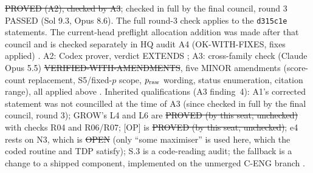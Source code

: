 \begin{statusbox}
\st{PROVED (A2), checked by A3}; checked in full by the final council, round 3 PASSED (Sol 9.3, Opus 8.6). The full round-3 check applies to the \texttt{d315c1e} statements. The current-head preflight allocation addition was made after that council and is checked separately in HQ audit A4 (OK-WITH-FIXES, fixes applied) . A2: Codex prover, verdict EXTENDS ; A3: cross-family check (Claude Opus 5.5) \st{VERIFIED-WITH-AMENDMENTS}, five MINOR amendments (score-count replacement, S5/fixed-$p$ scope, $p_{\rm raw}$ wording, status enumeration, citation range), all applied above . Inherited qualifications (A3 finding~4): A1's corrected statement was not councilled at the time of A3 (since checked in full by the final council, round 3); GROW's L4 and L6 are \st{PROVED (by this seat, unchecked)} with checks R04 and R06/R07; [OP] is \st{PROVED (by this seat, unchecked)}; e4 rests on N3, which is \st{OPEN} (only ``some maximiser'' is used here, which the coded routine and TDP satisfy); S.3 is a code-reading audit; the fallback is a change to a shipped component, implemented on the unmerged C-ENG branch .
\end{statusbox}

